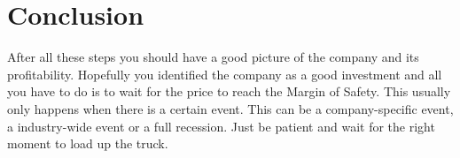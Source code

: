 \section{Conclusion}

After all these steps you should have a good picture of the company and its profitability.
Hopefully you identified the company as a good investment and all you have to do is to
wait for the price to reach the Margin of Safety. This usually only happens when there
is a certain event. This can be a company-specific event, a industry-wide event or a full
recession. Just be patient and wait for the right moment to load up the truck.
